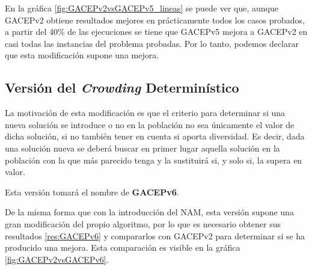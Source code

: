 En la gráfica \ref{fig:GACEPv2vsGACEPv5_lineas} se puede ver que, aunque GACEPv2 obtiene resultados mejores en prácticamente todos los casos probados, a partir del 40\% de las ejecuciones se tiene que GACEPv5 mejora a GACEPv2 en casi todas las instancias del problema probadas. 
Por lo tanto, podemos declarar que esta modificación supone una mejora. 

\subsection{Versión del \textit{Crowding} Determinístico}

La motivación de esta modificación es que el criterio para determinar si una nueva solución se introduce o no en la población no sea únicamente el valor de dicha solución, si no también tener en cuenta si aporta diversidad. 
Es decir, dada una solución nueva se deberá buscar en primer lugar aquella solución en la población con la que más parecido tenga y la sustituirá si, y solo si, la supera en valor. 

Esta versión tomará el nombre de \textbf{GACEPv6}. 

De la misma forma que con la introducción del NAM, esta versión supone una gran modificación del propio algoritmo, por lo que es necesario obtener sus resultados \ref{res:GACEPv6} y compararlos con GACEPv2 para determinar si se ha producido una mejora. 
Esta comparación es visible en la gráfica \ref{fig:GACEPv2vsGACEPv6}.

